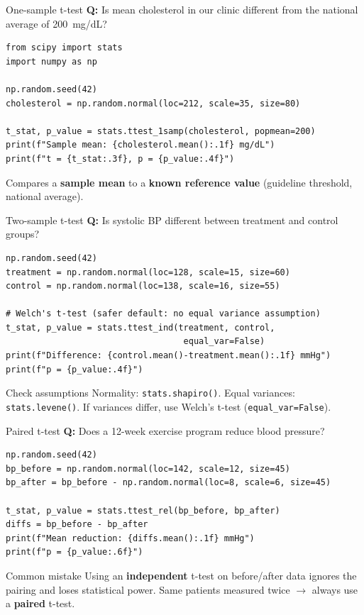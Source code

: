 \documentclass[aspectratio=169,11pt]{beamer}
\begin{document}
\begin{frame}[fragile]{One-sample t-test}
\textbf{Q:} Is mean cholesterol in our clinic different from the national average of 200~mg/dL?

\begin{verbatim}
from scipy import stats
import numpy as np

np.random.seed(42)
cholesterol = np.random.normal(loc=212, scale=35, size=80)

t_stat, p_value = stats.ttest_1samp(cholesterol, popmean=200)
print(f"Sample mean: {cholesterol.mean():.1f} mg/dL")
print(f"t = {t_stat:.3f}, p = {p_value:.4f}")
\end{verbatim}

Compares a \textbf{sample mean} to a \textbf{known reference value} (guideline threshold, national average).
\end{frame}

\begin{frame}[fragile]{Two-sample t-test}
\textbf{Q:} Is systolic BP different between treatment and control groups?

\begin{verbatim}
np.random.seed(42)
treatment = np.random.normal(loc=128, scale=15, size=60)
control = np.random.normal(loc=138, scale=16, size=55)

# Welch's t-test (safer default: no equal variance assumption)
t_stat, p_value = stats.ttest_ind(treatment, control,
                                   equal_var=False)
print(f"Difference: {control.mean()-treatment.mean():.1f} mmHg")
print(f"p = {p_value:.4f}")
\end{verbatim}

\begin{exampleblock}{Check assumptions}
Normality: \texttt{stats.shapiro()}. Equal variances: \texttt{stats.levene()}. If variances differ, use Welch's t-test (\texttt{equal\_var=False}).
\end{exampleblock}
\end{frame}

\begin{frame}[fragile]{Paired t-test}
\textbf{Q:} Does a 12-week exercise program reduce blood pressure?

\begin{verbatim}
np.random.seed(42)
bp_before = np.random.normal(loc=142, scale=12, size=45)
bp_after = bp_before - np.random.normal(loc=8, scale=6, size=45)

t_stat, p_value = stats.ttest_rel(bp_before, bp_after)
diffs = bp_before - bp_after
print(f"Mean reduction: {diffs.mean():.1f} mmHg")
print(f"p = {p_value:.6f}")
\end{verbatim}

\begin{alertblock}{Common mistake}
Using an \textbf{independent} t-test on before/after data ignores the pairing and loses statistical power. Same patients measured twice $\to$ always use a \textbf{paired} t-test.
\end{alertblock}
\end{frame}
\end{document}
